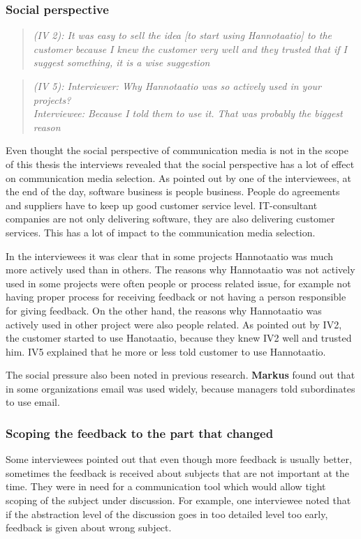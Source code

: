 \documentclass[english,12pt,a4paper,pdftex]{article}
\newcommand{\q}[2]{
\begin{quote}
\emph{(IV #1): #2}
\end{quote}}
\begin{document}
\subsubsection{Social perspective}

\q{2}{It was easy to sell the idea [to start using Hannotaatio] to the customer because I knew the customer very well and they trusted that if I suggest something, it is a wise suggestion}

\q{5}{Interviewer: Why Hannotaatio was so actively used in your projects? \\ Interviewee: Because I told them to use it. That was probably the biggest reason}

Even thought the social perspective of communication media is not in the scope of this thesis the interviews revealed that the social perspective has a lot of effect on communication media selection. As pointed out by one of the interviewees, at the end of the day, software business is people business. People do agreements and suppliers have to keep up good customer service level. IT-consultant companies are not only delivering software, they are also delivering customer services. This has a lot of impact to the communication media selection.

In the interviewees it was clear that in some projects Hannotaatio was much more actively used than in others. The reasons why Hannotaatio was not actively used in some projects were often people or process related issue, for example not having proper process for receiving feedback or not having a person responsible for giving feedback. On the other hand, the reasons why Hannotaatio was actively used in other project were also people related. As pointed out by IV2, the customer started to use Hanotaatio, because they knew IV2 well and trusted him. IV5 explained that he more or less told customer to use Hannotaatio.

The social pressure also been noted in previous research. \textbf{Markus} found out that in some organizations email was used widely, because managers told subordinates to use email.

\subsubsection{Scoping the feedback to the part that changed}

Some interviewees pointed out that even though more feedback is usually better, sometimes the feedback is received about subjects that are not important at the time. They were in need for a communication tool which would allow tight scoping of the subject under discussion. For example, one interviewee noted that if the abstraction level of the discussion goes in too detailed level too early, feedback is given about wrong subject.
\end{document}
